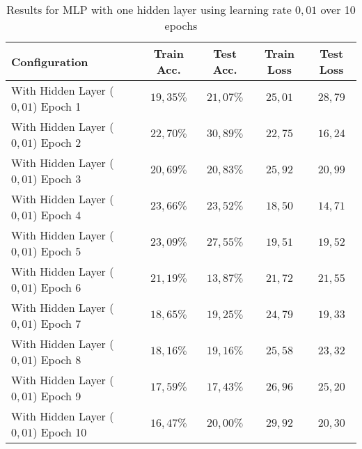 \documentclass[a4paper]{article}
\begin{document}
\begin{table}[h!]
\centering
\begin{tabular}{|l|c|c|c|c|}
\hline
\textbf{Configuration} & \textbf{Train Acc.} & \textbf{Test Acc.} & \textbf{Train Loss} & \textbf{Test Loss} \\
\hline
With Hidden Layer ($0{,}01$) Epoch 1 & $19{,}35\%$ & $21{,}07\%$ & $25{,}01$ & $28{,}79$ \\
With Hidden Layer ($0{,}01$) Epoch 2 & $22{,}70\%$ & $30{,}89\%$ & $22{,}75$ & $16{,}24$ \\
With Hidden Layer ($0{,}01$) Epoch 3 & $20{,}69\%$ & $20{,}83\%$ & $25{,}92$ & $20{,}99$ \\
With Hidden Layer ($0{,}01$) Epoch 4 & $23{,}66\%$ & $23{,}52\%$ & $18{,}50$ & $14{,}71$ \\
With Hidden Layer ($0{,}01$) Epoch 5 & $23{,}09\%$ & $27{,}55\%$ & $19{,}51$ & $19{,}52$ \\
With Hidden Layer ($0{,}01$) Epoch 6 & $21{,}19\%$ & $13{,}87\%$ & $21{,}72$ & $21{,}55$ \\
With Hidden Layer ($0{,}01$) Epoch 7 & $18{,}65\%$ & $19{,}25\%$ & $24{,}79$ & $19{,}33$ \\
With Hidden Layer ($0{,}01$) Epoch 8 & $18{,}16\%$ & $19{,}16\%$ & $25{,}58$ & $23{,}32$ \\
With Hidden Layer ($0{,}01$) Epoch 9 & $17{,}59\%$ & $17{,}43\%$ & $26{,}96$ & $25{,}20$ \\
With Hidden Layer ($0{,}01$) Epoch 10 & $16{,}47\%$ & $20{,}00\%$ & $29{,}92$ & $20{,}30$ \\
\hline
\end{tabular}
\caption{Results for MLP with one hidden layer using learning rate $0{,}01$ over 10 epochs}
\label{tab:with_hidden_01_results}
\end{table}
\end{document}
